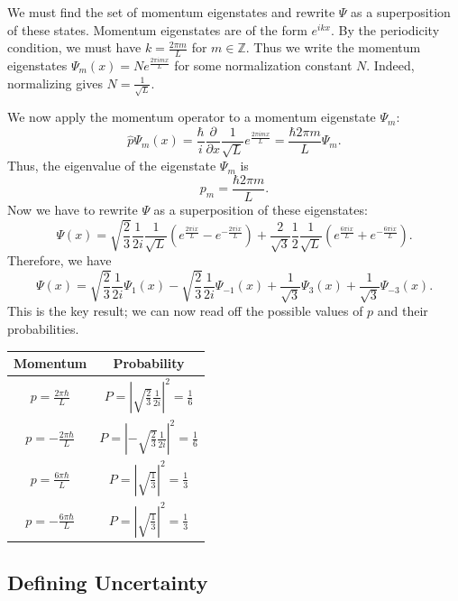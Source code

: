 \begin{framedansw*}
    We must find the set of momentum eigenstates and rewrite $\Psi$ as a superposition of these states. Momentum eigenstates are of the form $e^{ikx}$. By the periodicity condition, we must have $k=\frac{2\pi m}{L}$ for $m\in\mathbb{Z}$. Thus we write the momentum eigenstates $\Psi_m(x)=Ne^{\frac{2\pi imx}{L}}$ for some normalization constant $N$. Indeed, normalizing gives $N=\frac{1}{\sqrt{L}}$.

    We now apply the momentum operator to a momentum eigenstate $\Psi_m$: $$\hat{p}\Psi_m(x)=\frac{\hbar}{i}\frac{\partial}{\partial x}\frac{1}{\sqrt{L}}e^{\frac{2\pi imx}{L}}=\frac{\hbar 2\pi m}{L}\Psi_m.$$Thus, the eigenvalue of the eigenstate $\Psi_m$ is $$p_m=\frac{\hbar 2\pi m}{L}.$$Now we have to rewrite $\Psi$ as a superposition of these eigenstates: $$\Psi(x)=\sqrt{\frac{2}{3}}\frac{1}{2i}\frac{1}{\sqrt{L}}(e^{\frac{2\pi ix}{L}}-e^{-\frac{2\pi ix}{L}})+\frac{2}{\sqrt{3}}\frac{1}{2}\frac{1}{\sqrt{L}}(e^{\frac{6\pi ix}{L}}+e^{-\frac{6\pi ix}{L}}).$$Therefore, we have $$\Psi(x)=\sqrt{\frac{2}{3}}\frac{1}{2i}\Psi_1(x)-\sqrt{\frac{2}{3}}\frac{1}{2i}\Psi_{-1}(x)+\frac{1}{\sqrt{3}}\Psi_3(x)+\frac{1}{\sqrt{3}}\Psi_{-3}(x).$$This is the key result; we can now read off the possible values of $p$ and their probabilities.

    \centering
    \begin{tabular}{|c|c|}
        \hline
        Momentum & Probability \\
        \hline
        $p=\frac{2\pi\hbar}{L}$ & $P=|\sqrt{\frac{2}{3}}\frac{1}{2i}|^2=\frac{1}{6}$ \\
        $p=-\frac{2\pi\hbar}{L}$ & $P=|-\sqrt{\frac{2}{3}}\frac{1}{2i}|^2=\frac{1}{6}$ \\
        $p=\frac{6\pi\hbar}{L}$ &
        $P=|\sqrt{\frac{1}{3}}|^2=\frac{1}{3}$ \\
        $p=-\frac{6\pi\hbar}{L}$ &
        $P=|\sqrt{\frac{1}{3}}|^2=\frac{1}{3}$\\
        \hline
    \end{tabular}

\end{framedansw*}

\subsection{Defining Uncertainty}

